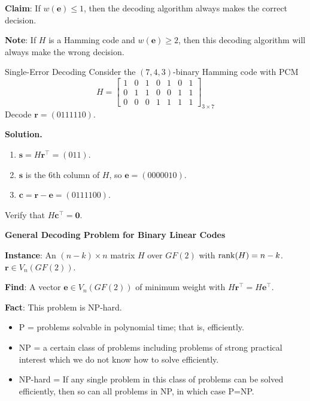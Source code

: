 \textbf{Claim}: If $ w(\symbf{e})\leqslant 1 $, then the decoding algorithm always
makes the correct decision.

\textbf{Note}: If $ H $ is a Hamming code and $ w(\symbf{e})\geqslant 2 $,
then this decoding algorithm will always make the wrong decision.

\begin{Example}{Single-Error Decoding}{}
    Consider the $ (7,4,3) $-binary Hamming code with PCM
    \[ H=\begin{bmatrix}
            1 & 0 & 1 & 0 & 1 & 0 & 1 \\
            0 & 1 & 1 & 0 & 0 & 1 & 1 \\
            0 & 0 & 0 & 1 & 1 & 1 & 1
        \end{bmatrix}_{3\times 7} \]
    Decode $ \symbf{r}=(0111110) $.

    \textbf{Solution.}
    \begin{enumerate}
        \item $ \symbf{s}=H\symbf{r}^\top=(011) $.
        \item $ \symbf{s} $ is the 6th column of $ H $, so $ \symbf{e}=(0000010) $.
        \item $ \symbf{c}=\symbf{r}-\symbf{e}=(0111100) $.
    \end{enumerate}
    Verify that $ H\symbf{c}^\top=\symbf{0} $.
\end{Example}

\textbf{General Decoding Problem for Binary Linear Codes}

\textbf{Instance}: An $ (n-k)\times n $ matrix $ H $ over $ GF(2) $
with $ \operatorname{rank}(H)=n-k $. $ \symbf{r}\in V_n(GF(2)) $.

\textbf{Find}: A vector $ \symbf{e}\in V_n(GF(2)) $ of minimum weight
with $ H\symbf{r}^\top=H\symbf{e}^\top $.

\textbf{Fact}: This problem is NP-hard.

\begin{itemize}
    \item P = problems solvable in polynomial time; that is, efficiently.
    \item NP = a certain class of problems including problems of strong
          practical interest which we do not know how to solve efficiently.
    \item NP-hard = If any single problem in this class of problems can be
          solved efficiently, then so can all problems in NP, in which case P=NP\@.
\end{itemize}
